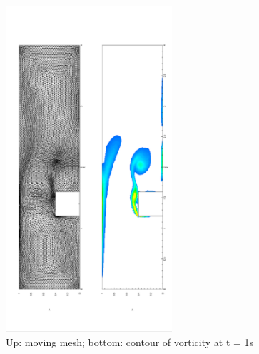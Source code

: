 \documentclass[a4paper, 11pt]{article}
\begin{document}
      \begin{figure}[!htbp]
        \centering
        \includegraphics[width = 0.55\textwidth, angle = -90]{picture/step_flow_data/mesh_t_1s.eps}
        \caption{\small Up: moving mesh; bottom: contour of vorticity
          at t = 1s}
        \label{fig::step_flow_1s}
      \end{figure}
\end{document}
